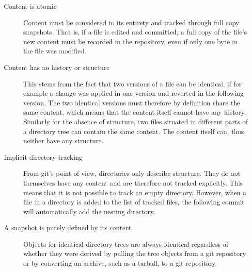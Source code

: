 \begin{description}

\item[Content is atomic]
%
	Content must be considered in its entirety and tracked through
	full copy snapshots. That is, if a file is edited and
	committed, a full copy of the file's new content must be
	recorded in the repository, even if only one byte in the file
	was modified.

\item[Content has no history or structure]
%
	This stems from the fact that two versions of a file can be
	identical, if for example a change was applied in one version
	and reverted in the following version. The two identical
	versions must therefore by definition share the same content,
	which means that the content itself cannot have any history.
	Similarly for the absence of structure, two files situated in
	different parts of a directory tree can contain the same
	content. The content itself can, thus, neither have any
	structure.


\item[Implicit directory tracking]
%
	From git's point of view, directories only describe structure.
	They do not themselves have any content and are therefore not
	tracked explicitly. This means that it is not possible to
	track an empty directory. However, when a file in a directory
	is added to the list of tracked files, the following commit
	will automatically add the nesting directory.

\item[A snapshot is purely defined by its content]
%
	Objects for identical directory trees are always identical
	regardless of whether they were derived by pulling the tree
	objects from a git repository or by converting an archive, such as
	a tarball, to a git repository.

\end{description}


